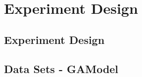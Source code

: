 


\section{Experiment Design}
\label{sec:experiment}

%

\subsection{Experiment Design}




\subsection{Data Sets - GAModel}

